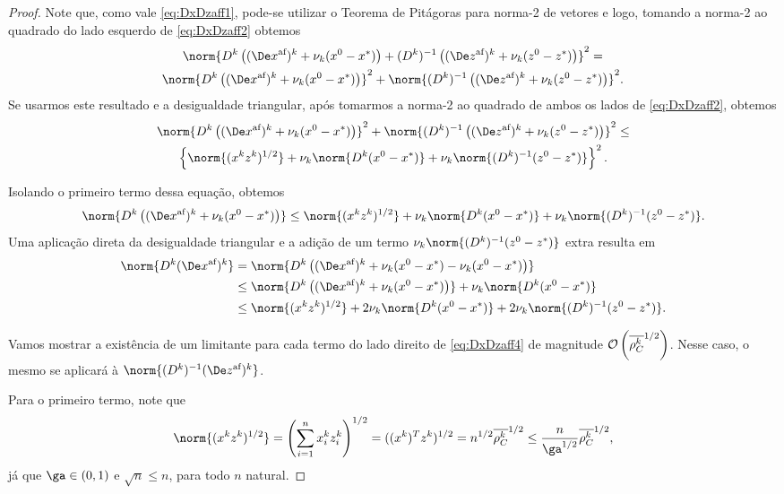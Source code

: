 \begin{proof}
	 Note que, como vale  \eqref{eq:DxDzaff1}, pode-se utilizar o Teorema de Pitágoras para norma-2 de vetores e logo, tomando a norma-2 ao quadrado do lado esquerdo de \eqref{eq:DxDzaff2} obtemos
	\begin{multline*}
			 	 \norm{\Dk\left( \dekx +  \nuk (\xzero - \xstar)\right)+ \Dik \left( \dekz  +  \nuk (\zzero - \zstar)\right)}^{2} =\\
	 	 	 	 	 \norm{\Dk\left( \dekx +  \nuk (\xzero - \xstar)\right)}^{2}+ \norm{\Dik \left( \dekz  +  \nuk (\zzero - \zstar)\right)}^{2}.
	\end{multline*}
	 Se  usarmos este resultado e a desigualdade triangular, após tomarmos a norma-2 ao quadrado de ambos os lados de \eqref{eq:DxDzaff2}, obtemos 
	 \begin{multline*}\label{eq:DxDzaff3}
	 \norm{\Dk\left( \dekx +  \nuk (\xzero - \xstar)\right)}^{2}+ \norm{\Dik \left( \dekz  +  \nuk (\zzero - \zstar)\right)}^{2} \leq \\ 
	 \left\{ \norm{(  \xk \zk   )^{1/2}} + \nuk  \norm{\Dk(\xzero - \xstar)} + \nuk  \norm{\Dik(\zzero - \zstar)} \right\}^{2}.
	 \end{multline*}

Isolando o primeiro termo dessa equação, obtemos
\[
\norm{\Dk\left( \dekx +  \nuk (\xzero - \xstar)\right)} \leq  
	  \norm{(  \xk \zk  )^{1/2}} + \nuk  \norm{\Dk(\xzero - \xstar)} + \nuk  \norm{\Dik(\zzero - \zstar)}.
\]
Uma aplicação direta da desigualdade triangular e a adição de um termo  $\nuk  \norm{\Dik(\zzero - \zstar)}$ extra resulta em
\begin{align}
	\norm{\Dk \dekx} & =  \norm{\Dk\left( \dekx  +  \nuk (\xzero - \xstar)  -  \nuk (\xzero - \xstar)\right)} \notag \\ 
				 & \leq	 \norm{\Dk\left( \dekx  +  \nuk (\xzero - \xstar)\right)} +  \nuk \norm{\Dk(\xzero - \xstar)} \notag \\
				 & \leq \norm{(  \xk \zk  )^{1/2}} + 2 \nuk  \norm{\Dk(\xzero - \xstar)} + 2\nuk  \norm{\Dik(\zzero - \zstar)}.\label{eq:DxDzaff4}
\end{align}

Vamos mostrar a existência de um limitante para cada termo do lado direito de \eqref{eq:DxDzaff4} de magnitude $\mathcal{O}\left(\overline{\rho_C^{k}} ^{1/2}\right)$. Nesse caso, o mesmo se aplicará à $\norm{\Dik \dekz }$.

Para o primeiro termo, note que 
\begin{equation}
	\label{eq:DxDzaff5}
	\norm{(  \xk \zk  )^{1/2}} = \left(\sum_{i=1}^{n}\xk_i \zk_i\right)^{1/2} = ((\xk)^{T}\zk)^{1/2} = n^{1/2}\rhoCkb ^{1/2} \leq \frac{n}{\ga^{1/2}}\rhoCkb ^{1/2},
\end{equation}
já que $\ga\in(0,1)$ e $\sqrt{n}\leq n$, para todo $n$ natural.


\end{proof}
